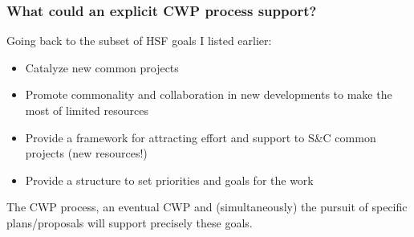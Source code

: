 \begin{frame}
 \frametitle{What could an explicit CWP process support?}
Going back to the subset of HSF goals I listed earlier:

\begin{itemize}
\item Catalyze new common projects
\item Promote commonality and collaboration in new developments to make the most of limited resources
\item Provide a framework for attracting effort and support to S\&C common projects (new resources!)
\item Provide a structure to set priorities and goals for the work
\end{itemize}

The CWP process, an eventual CWP and (simultaneously) the pursuit of specific plans/proposals will support precisely these goals.

\end{frame}


